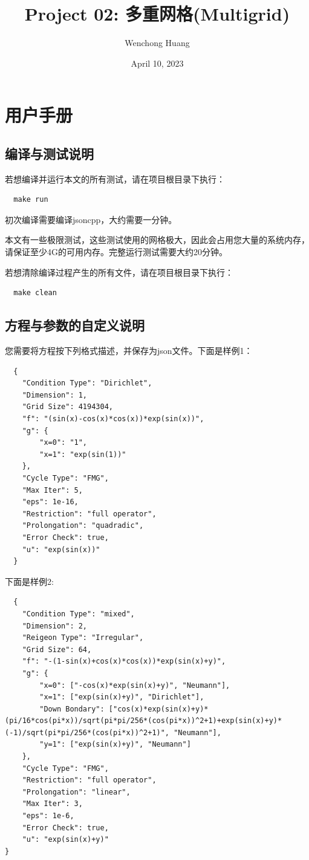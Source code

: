 \documentclass[lang=cn,10pt]{elegantbook}
\title{Project 02: 多重网格(Multigrid)}
\author{Wenchong Huang}
\date{April 10, 2023}
\begin{document}
\maketitle
\frontmatter

\tableofcontents

\mainmatter

\chapter{用户手册}

\section{编译与测试说明}

若想编译并运行本文的所有测试，请在项目根目录下执行：
\begin{lstlisting}
  make run
\end{lstlisting}

初次编译需要编译jsoncpp，大约需要一分钟。

本文有一些极限测试，这些测试使用的网格极大，因此会占用您大量的系统内存，请保证至少4G的可用内存。完整运行测试需要大约20分钟。

若想清除编译过程产生的所有文件，请在项目根目录下执行：
\begin{lstlisting}
  make clean
\end{lstlisting}

\section{方程与参数的自定义说明}

您需要将方程按下列格式描述，并保存为json文件。下面是样例1：
\begin{lstlisting}
  {
    "Condition Type": "Dirichlet",
    "Dimension": 1,
    "Grid Size": 4194304,
    "f": "(sin(x)-cos(x)*cos(x))*exp(sin(x))",
    "g": {
        "x=0": "1",
        "x=1": "exp(sin(1))"
    },
    "Cycle Type": "FMG",
    "Max Iter": 5,
    "eps": 1e-16,
    "Restriction": "full operator",
    "Prolongation": "quadradic",
    "Error Check": true,
    "u": "exp(sin(x))"
  }
\end{lstlisting}

下面是样例2:
\begin{lstlisting}
  {
    "Condition Type": "mixed",
    "Dimension": 2,
    "Reigeon Type": "Irregular",
    "Grid Size": 64,
    "f": "-(1-sin(x)+cos(x)*cos(x))*exp(sin(x)+y)",
    "g": {
        "x=0": ["-cos(x)*exp(sin(x)+y)", "Neumann"],
        "x=1": ["exp(sin(x)+y)", "Dirichlet"],
        "Down Bondary": ["cos(x)*exp(sin(x)+y)*(pi/16*cos(pi*x))/sqrt(pi*pi/256*(cos(pi*x))^2+1)+exp(sin(x)+y)*(-1)/sqrt(pi*pi/256*(cos(pi*x))^2+1)", "Neumann"],
        "y=1": ["exp(sin(x)+y)", "Neumann"]
    },
    "Cycle Type": "FMG",
    "Restriction": "full operator",
    "Prolongation": "linear",
    "Max Iter": 3,
    "eps": 1e-6,
    "Error Check": true,
    "u": "exp(sin(x)+y)"
}
\end{lstlisting}
\end{document}
